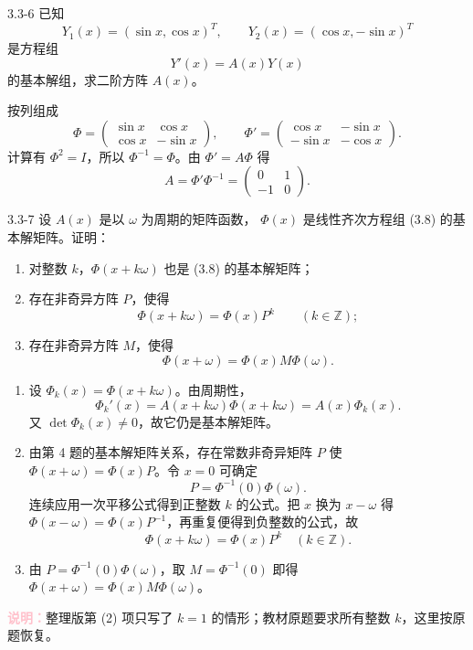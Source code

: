 \documentclass[UTF8,a4paper,11pt]{ctexart}
\newcommand{\note}[1]{\par\smallskip\noindent\textcolor{pink}{\bfseries 说明：}#1\par\smallskip}
\begin{document}
\begin{problem}{3.3-6}
已知
  \[
    Y_1(x)=(\sin x,\cos x)^T,\qquad
    Y_2(x)=(\cos x,-\sin x)^T
  \]
  是方程组
  \[
    Y'(x)=A(x)Y(x)
  \]
  的基本解组，求二阶方阵 $A(x)$。
\end{problem}

\begin{solution}
按列组成
\[
\Phi=\begin{pmatrix}\sin x&\cos x\\\cos x&-\sin x\end{pmatrix},
\qquad\Phi'=\begin{pmatrix}\cos x&-\sin x\\-\sin x&-\cos x\end{pmatrix}.
\]
计算有 $\Phi^2=I$，所以 $\Phi^{-1}=\Phi$。由 $\Phi'=A\Phi$ 得
\[
\boxed{A=\Phi'\Phi^{-1}=\begin{pmatrix}0&1\\-1&0\end{pmatrix}}.
\]
\end{solution}

\begin{problem}{3.3-7}
设 $A(x)$ 是以 $\omega$ 为周期的矩阵函数，
  $\Phi(x)$ 是线性齐次方程组 (3.8) 的基本解矩阵。证明：
  \begin{enumerate}[label=(\arabic*)]
    \item 对整数 $k$，$\Phi(x+k\omega)$ 也是 (3.8) 的基本解矩阵；
    \item 存在非奇异方阵 $P$，使得
    \[
      \Phi(x+k\omega)=\Phi(x)P^k\qquad(k\in\mathbb Z);
    \]
    \item 存在非奇异方阵 $M$，使得
    \[
      \Phi(x+\omega)=\Phi(x)M\Phi(\omega).
    \]
  \end{enumerate}
\end{problem}

\begin{solution}
\begin{enumerate}[label=(\arabic*)]
\item 设 $\Phi_k(x)=\Phi(x+k\omega)$。由周期性，
\[
\Phi_k'(x)=A(x+k\omega)\Phi(x+k\omega)=A(x)\Phi_k(x).
\]
又 $\det\Phi_k(x)\ne0$，故它仍是基本解矩阵。
\item 由第 4 题的基本解矩阵关系，存在常数非奇异矩阵 $P$ 使 $\Phi(x+\omega)=\Phi(x)P$。令 $x=0$ 可确定
\[
P=\Phi^{-1}(0)\Phi(\omega).
\]
连续应用一次平移公式得到正整数 $k$ 的公式。把 $x$ 换为 $x-\omega$ 得 $\Phi(x-\omega)=\Phi(x)P^{-1}$，再重复便得到负整数的公式，故
\[\boxed{\Phi(x+k\omega)=\Phi(x)P^k\quad(k\in\mathbb Z)}.\]
\item 由 $P=\Phi^{-1}(0)\Phi(\omega)$，取 $\boxed{M=\Phi^{-1}(0)}$ 即得 $\Phi(x+\omega)=\Phi(x)M\Phi(\omega)$。
\end{enumerate}
\note{整理版第 (2) 项只写了 $k=1$ 的情形；教材原题要求所有整数 $k$，这里按原题恢复。}
\end{solution}
\end{document}
